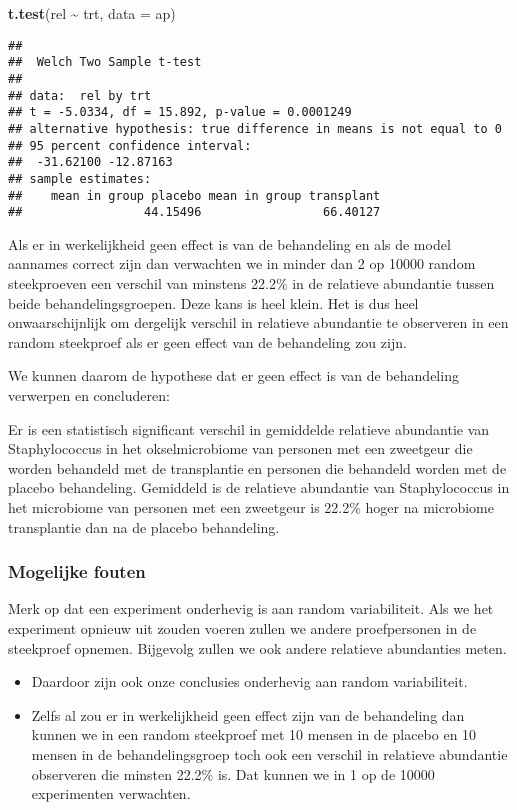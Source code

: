 \documentclass[
  12pt,dutch,coursenotes]{book}
\newenvironment{Shaded}{\begin{snugshade}}{\end{snugshade}}
\newcommand{\DataTypeTok}[1]{\textcolor[rgb]{0.13,0.29,0.53}{#1}}
\newcommand{\KeywordTok}[1]{\textcolor[rgb]{0.13,0.29,0.53}{\textbf{#1}}}
\newcommand{\NormalTok}[1]{#1}
\newcommand{\OperatorTok}[1]{\textcolor[rgb]{0.81,0.36,0.00}{\textbf{#1}}}
\newcommand{\StringTok}[1]{\textcolor[rgb]{0.31,0.60,0.02}{#1}}
\theoremstyle{definition}
\theoremstyle{definition}
\theoremstyle{definition}
\theoremstyle{remark}
\begin{document}
\begin{Shaded}
\begin{Highlighting}[]
\KeywordTok{t.test}\NormalTok{(rel }\OperatorTok{\textasciitilde{}}\StringTok{ }\NormalTok{trt, }\DataTypeTok{data =}\NormalTok{ ap)}
\end{Highlighting}
\end{Shaded}

\begin{verbatim}
## 
## 	Welch Two Sample t-test
## 
## data:  rel by trt
## t = -5.0334, df = 15.892, p-value = 0.0001249
## alternative hypothesis: true difference in means is not equal to 0
## 95 percent confidence interval:
##  -31.62100 -12.87163
## sample estimates:
##    mean in group placebo mean in group transplant 
##                 44.15496                 66.40127
\end{verbatim}

Als er in werkelijkheid geen effect is van de behandeling en als de model aannames correct zijn dan verwachten we in minder dan 2 op 10000 random steekproeven een verschil van minstens 22.2\% in de relatieve abundantie tussen beide behandelingsgroepen.
Deze kans is heel klein. Het is dus heel onwaarschijnlijk om dergelijk verschil in relatieve abundantie te observeren in een random steekproef als er geen effect van de behandeling zou zijn.

We kunnen daarom de hypothese dat er geen effect is van de behandeling verwerpen en concluderen:

Er is een statistisch significant verschil in gemiddelde relatieve abundantie van Staphylococcus in het okselmicrobiome van personen met een zweetgeur die worden behandeld met de transplantie en personen die behandeld worden met de placebo behandeling.
Gemiddeld is de relatieve abundantie van Staphylococcus in het microbiome van personen met een zweetgeur is 22.2\% hoger na microbiome transplantie dan na de placebo behandeling.

\hypertarget{mogelijke-fouten}{%
\subsubsection{Mogelijke fouten}\label{mogelijke-fouten}}

Merk op dat een experiment onderhevig is aan random variabiliteit. Als we het experiment opnieuw uit zouden voeren zullen we andere proefpersonen in de steekproef opnemen. Bijgevolg zullen we ook andere relatieve abundanties meten.

\begin{itemize}
\item
  Daardoor zijn ook onze conclusies onderhevig aan random variabiliteit.
\item
  Zelfs al zou er in werkelijkheid geen effect zijn van de behandeling dan kunnen we in een random steekproef met 10 mensen in de placebo en 10 mensen in de behandelingsgroep toch ook een verschil in relatieve abundantie observeren die minsten 22.2\% is. Dat kunnen we in 1 op de 10000 experimenten verwachten.
\end{itemize}
\end{document}
